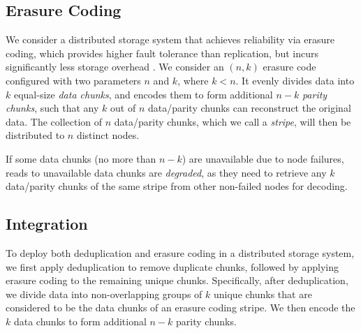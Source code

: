 
\subsection{Erasure Coding}

We consider a distributed storage system that achieves reliability via erasure
coding, which provides higher fault tolerance than replication, but incurs
significantly less storage overhead \cite{weatherspoon02}.  We consider an
$(n,k)$ erasure code configured with
two parameters $n$ and $k$, where $k<n$.  It evenly divides data into $k$
equal-size {\em data chunks}, and encodes them to form additional $n-k$ 
{\em parity chunks}, such that any $k$ out of $n$ data/parity chunks can
reconstruct the original data. The collection of $n$ data/parity chunks, which
we call a {\em stripe}, will then be distributed to $n$ distinct nodes.

If some data chunks (no more than $n-k$) are unavailable due to node failures,
reads to unavailable data chunks are {\em degraded}, as they need to retrieve
any $k$ data/parity chunks of the same stripe from other non-failed nodes for
decoding.  
   
\subsection{Integration}

To deploy both deduplication and erasure coding in a distributed storage
system, we first apply deduplication to remove duplicate chunks, followed by
applying erasure coding to the remaining unique chunks.  Specifically, after
deduplication, we divide data into non-overlapping groups of $k$ unique chunks
that are considered to be the data chunks of an erasure coding stripe.  We then
encode the $k$ data chunks to form additional $n-k$ parity chunks.  

